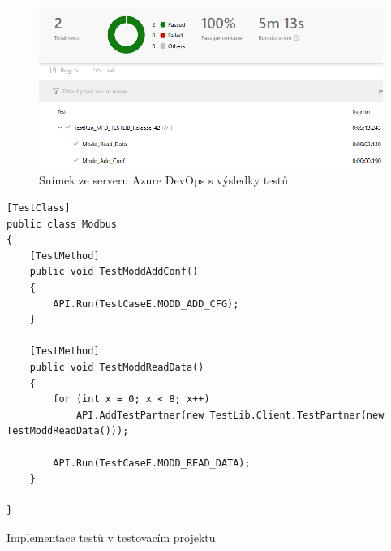 \begin{figure}[htbp]
    \centering 
    \includegraphics[width=\textwidth]{assets/img/azure.png}
    \caption{Snímek ze serveru Azure DevOps s výsledky testů}
    \label{fig:azure}
\end{figure}





\begin{listing}[p]
    \centering
    \begin{verbatim}
[TestClass]
public class Modbus
{
    [TestMethod]
    public void TestModdAddConf()
    {
        API.Run(TestCaseE.MODD_ADD_CFG);
    }
    
    [TestMethod]
    public void TestModdReadData()
    {
        for (int x = 0; x < 8; x++)
            API.AddTestPartner(new TestLib.Client.TestPartner(new TestModdReadData()));
    
        API.Run(TestCaseE.MODD_READ_DATA);
    }
    
}
    \end{verbatim}
\caption{Implementace testů v testovacím projektu}
\label{listing:testcase_service}
\end{listing}


